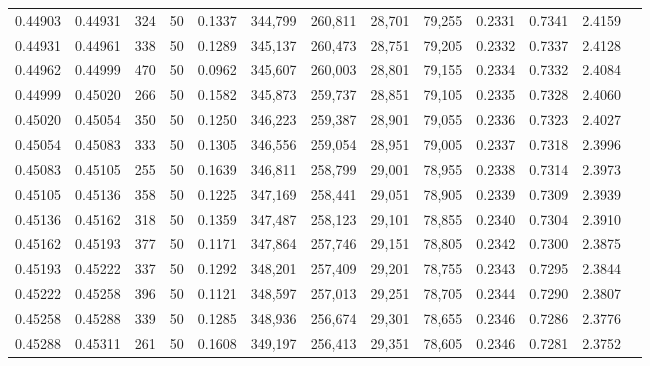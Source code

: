 \begin{tabular}{rrrrrrrrrrrrr}
0.44903 & 0.44931 &   324 &  50 &                                     0.1337 & 344,799 & 260,811 &  28,701 &  79,255 & 0.2331 & 0.7341 & 2.4159 \\
0.44931 & 0.44961 &   338 &  50 &                                     0.1289 & 345,137 & 260,473 &  28,751 &  79,205 & 0.2332 & 0.7337 & 2.4128 \\
0.44962 & 0.44999 &   470 &  50 &                                     0.0962 & 345,607 & 260,003 &  28,801 &  79,155 & 0.2334 & 0.7332 & 2.4084 \\
0.44999 & 0.45020 &   266 &  50 &                                     0.1582 & 345,873 & 259,737 &  28,851 &  79,105 & 0.2335 & 0.7328 & 2.4060 \\
0.45020 & 0.45054 &   350 &  50 &                                     0.1250 & 346,223 & 259,387 &  28,901 &  79,055 & 0.2336 & 0.7323 & 2.4027 \\
0.45054 & 0.45083 &   333 &  50 &                                     0.1305 & 346,556 & 259,054 &  28,951 &  79,005 & 0.2337 & 0.7318 & 2.3996 \\
0.45083 & 0.45105 &   255 &  50 &                                     0.1639 & 346,811 & 258,799 &  29,001 &  78,955 & 0.2338 & 0.7314 & 2.3973 \\
0.45105 & 0.45136 &   358 &  50 &                                     0.1225 & 347,169 & 258,441 &  29,051 &  78,905 & 0.2339 & 0.7309 & 2.3939 \\
0.45136 & 0.45162 &   318 &  50 &                                     0.1359 & 347,487 & 258,123 &  29,101 &  78,855 & 0.2340 & 0.7304 & 2.3910 \\
0.45162 & 0.45193 &   377 &  50 &                                     0.1171 & 347,864 & 257,746 &  29,151 &  78,805 & 0.2342 & 0.7300 & 2.3875 \\
0.45193 & 0.45222 &   337 &  50 &                                     0.1292 & 348,201 & 257,409 &  29,201 &  78,755 & 0.2343 & 0.7295 & 2.3844 \\
0.45222 & 0.45258 &   396 &  50 &                                     0.1121 & 348,597 & 257,013 &  29,251 &  78,705 & 0.2344 & 0.7290 & 2.3807 \\
0.45258 & 0.45288 &   339 &  50 &                                     0.1285 & 348,936 & 256,674 &  29,301 &  78,655 & 0.2346 & 0.7286 & 2.3776 \\
0.45288 & 0.45311 &   261 &  50 &                                     0.1608 & 349,197 & 256,413 &  29,351 &  78,605 & 0.2346 & 0.7281 & 2.3752 \\

\end{tabular}
